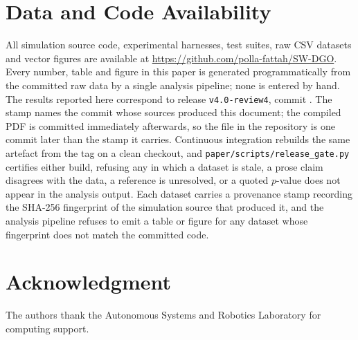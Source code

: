 \documentclass[journal]{IEEEtran}
\newif\ifanonymous
\begin{document}
\section*{Data and Code Availability}
\ifanonymous All simulation source code, experimental harnesses, test suites, raw CSV datasets and vector figures will be released under open licences in a public repository; the URL is withheld here because it identifies the authors, and will be supplied on acceptance. \else All simulation source code, experimental harnesses, test suites, raw CSV datasets and vector figures are available at \url{https://github.com/polla-fattah/SW-DGO}. \fi Every number, table and figure in this paper is generated programmatically from the committed raw data by a single analysis pipeline; none is entered by hand. The results reported here correspond to release \texttt{v4.0-review4}, commit \texttt{\PaperCommitSHA}. The stamp names the commit whose sources produced this document; the compiled PDF is committed immediately afterwards, so the file in the repository is one commit later than the stamp it carries. Continuous integration rebuilds the same artefact from the tag on a clean checkout, and \texttt{paper/scripts/release\_gate.py} certifies either build, refusing any in which a dataset is stale, a prose claim disagrees with the data, a reference is unresolved, or a quoted $p$-value does not appear in the analysis output. Each dataset carries a provenance stamp recording the SHA-256 fingerprint of the simulation source that produced it, and the analysis pipeline refuses to emit a table or figure for any dataset whose fingerprint does not match the committed code.

\ifanonymous\else
\section*{Acknowledgment}
The authors thank the Autonomous Systems and Robotics Laboratory for computing support.
\fi



\end{document}
